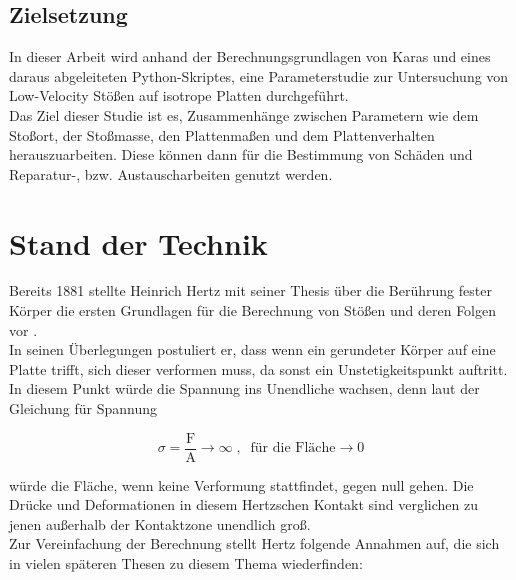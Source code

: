 \section*{Zielsetzung}
In dieser Arbeit wird anhand der Berechnungsgrundlagen von Karas und eines
daraus abgeleiteten Python-Skriptes, eine Parameterstudie zur Untersuchung von
Low-Velocity Stößen auf isotrope Platten durchgeführt. \\
Das Ziel dieser Studie ist es, Zusammenhänge zwischen Parametern wie dem Stoßort,
der Stoßmasse, den Plattenmaßen und dem Plattenverhalten herauszuarbeiten. Diese
können dann für die Bestimmung von Schäden und Reparatur-, bzw.
Austauscharbeiten genutzt werden.\\

\chapter{Stand der Technik}

Bereits 1881 stellte Heinrich Hertz mit seiner Thesis über die Berührung fester
Körper die ersten Grundlagen für die Berechnung von Stößen und deren Folgen vor
\cite{Hertz.1881}. \\
In seinen Überlegungen postuliert er, dass wenn ein gerundeter Körper auf eine
Platte trifft, sich dieser verformen muss, da sonst ein Unstetigkeitspunkt
auftritt. In diesem Punkt würde die Spannung ins Unendliche wachsen, denn laut
der Gleichung für Spannung 

\begin{equation}
\label{form:Druck}
\sigma = \frac{\mbox{F}}{\mbox{A}} \rightarrow \infty \; , \; \; \mbox{für die Fläche} \rightarrow 0
\end{equation}

würde die Fläche, wenn keine Verformung stattfindet, gegen null gehen. Die Drücke
und Deformationen in diesem Hertzschen Kontakt sind verglichen zu jenen
außerhalb der Kontaktzone unendlich groß. \\
Zur Vereinfachung der Berechnung stellt Hertz folgende Annahmen auf, die sich in
vielen späteren Thesen zu diesem Thema wiederfinden:

